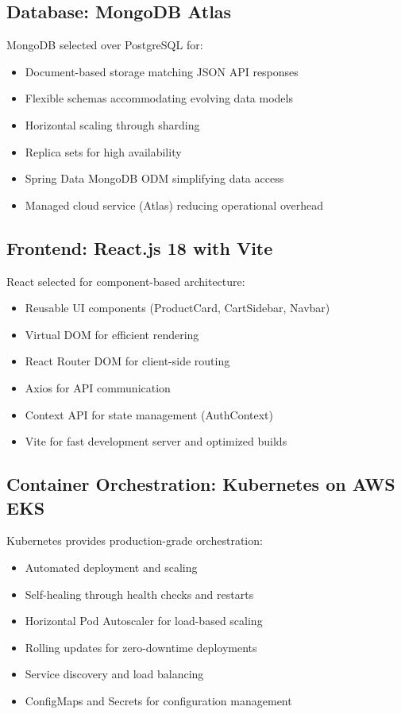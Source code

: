 \subsection{Database: MongoDB Atlas}

MongoDB selected over PostgreSQL for:
\begin{itemize}
    \item Document-based storage matching JSON API responses
    \item Flexible schemas accommodating evolving data models
    \item Horizontal scaling through sharding
    \item Replica sets for high availability
    \item Spring Data MongoDB ODM simplifying data access
    \item Managed cloud service (Atlas) reducing operational overhead
\end{itemize}

\subsection{Frontend: React.js 18 with Vite}

React selected for component-based architecture:
\begin{itemize}
    \item Reusable UI components (ProductCard, CartSidebar, Navbar)
    \item Virtual DOM for efficient rendering
    \item React Router DOM for client-side routing
    \item Axios for API communication
    \item Context API for state management (AuthContext)
    \item Vite for fast development server and optimized builds
\end{itemize}

\subsection{Container Orchestration: Kubernetes on AWS EKS}

Kubernetes provides production-grade orchestration:
\begin{itemize}
    \item Automated deployment and scaling
    \item Self-healing through health checks and restarts
    \item Horizontal Pod Autoscaler for load-based scaling
    \item Rolling updates for zero-downtime deployments
    \item Service discovery and load balancing
    \item ConfigMaps and Secrets for configuration management
\end{itemize}

